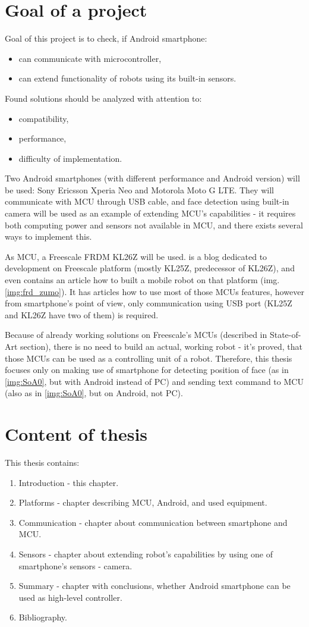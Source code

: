 \documentclass[openany]{mgr} %
\begin{document}
\section{Goal of a project}
Goal of this project is to check, if Android smartphone:
\begin{itemize}
  \item can communicate with microcontroller,
  \item can extend functionality of robots using its built-in sensors.
\end{itemize}
Found solutions should be analyzed with attention to:
\begin{itemize}
  \item compatibility,
  \item performance,
  \item difficulty of implementation.
\end{itemize}
Two Android smartphones (with different performance and Android version) will be
used: Sony Ericsson Xperia Neo and Motorola Moto G LTE. They will communicate
with MCU through USB cable, and face detection using built-in camera will be
used as an example of extending MCU's capabilities - it requires both computing
power and sensors not available in MCU, and there exists several ways to
implement this.

As MCU, a Freescale FRDM KL26Z will be used. \cite{mcu_on_eclipse} is a blog
dedicated to development on Freescale platform (mostly KL25Z, predecessor of
KL26Z), and even contains an article how to built a mobile robot on that
platform (img. \ref{img:frd_zumo}). It has articles how to use most of
those MCUs features, however from smartphone's point of view, only communication
using USB port (KL25Z and KL26Z have two of them) is required.

Because of already working solutions on Freescale's MCUs (described in
State-of-Art section), there is no need to build an actual, working robot - it's
proved, that those MCUs can be used as a controlling unit of a robot. Therefore,
this thesis focuses only on making use of smartphone for detecting position of
face (as in \ref{img:SoA0}, but with Android instead of PC) and sending text
command to MCU (also as in \ref{img:SoA0}, but on Android, not PC).

\section{Content of thesis}
This thesis contains:
\begin{enumerate}
  \item Introduction - this chapter.
  \item Platforms - chapter describing MCU, Android, and used equipment.
  \item Communication - chapter about communication between smartphone and MCU.
  \item Sensors - chapter about extending robot's capabilities by using one of
  smartphone's sensors - camera.
  \item Summary - chapter with conclusions, whether Android smartphone can be
  used as high-level controller.
  \item Bibliography.
\end{enumerate}
\end{document}
